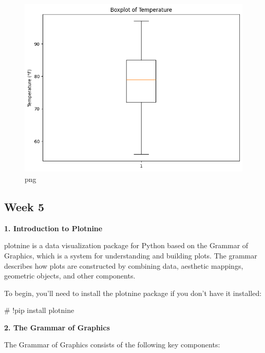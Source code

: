 \documentclass[
  letterpaper,
  DIV=11,
  numbers=noendperiod]{scrreprt}
\newenvironment{Shaded}{\begin{snugshade}}{\end{snugshade}}
\newcommand{\CommentTok}[1]{\textcolor[rgb]{0.37,0.37,0.37}{#1}}
\begin{document}
\begin{figure}[H]

{\centering \includegraphics{week4_baruga_python_files/week4_baruga_python_9_0.png}

}

\caption{png}

\end{figure}%

\subsection{Week 5}\label{week-5-2}

\textbf{1. Introduction to Plotnine}

plotnine is a data visualization package for Python based on the Grammar
of Graphics, which is a system for understanding and building plots. The
grammar describes how plots are constructed by combining data, aesthetic
mappings, geometric objects, and other components.

To begin, you'll need to install the plotnine package if you don't have
it installed:

\begin{Shaded}
\begin{Highlighting}[]
\CommentTok{\# !pip install plotnine}
\end{Highlighting}
\end{Shaded}

\textbf{2. The Grammar of Graphics}

The Grammar of Graphics consists of the following key components:
\end{document}
